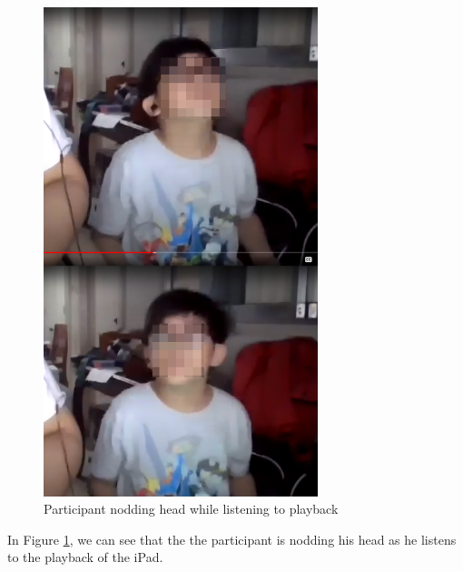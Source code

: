 \begin{figure}[H]
    \centering
    \includegraphics[width=8cm]{figures/Results/UTpictures/noddingboyblur.png}
    \caption{Participant nodding head while listening to playback}
    \label{fig:noddingparticipant}
\end{figure}

In Figure \ref{fig:noddingparticipant}, we can see that the the participant is nodding his head as he listens to the playback of the iPad.

